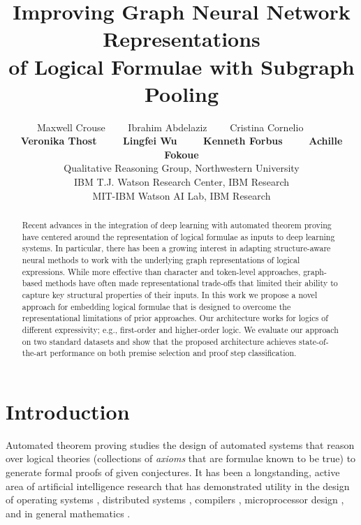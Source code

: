 \documentclass{article}
\title{Improving Graph Neural Network Representations \\ of Logical Formulae with Subgraph Pooling}
\author{Maxwell Crouse \ \ \ \ Ibrahim Abdelaziz \ \ \ \ Cristina Cornelio \ \ \ \ \\ {\bf Veronika Thost \ \ \ \ Lingfei Wu \ \ \ \ Kenneth Forbus \ \ \ \ Achille Fokoue} \\
  Qualitative Reasoning Group, Northwestern University \\
  IBM T.J. Watson Research Center, IBM Research \\
  MIT-IBM Watson AI Lab, IBM Research
}
\begin{document}
\maketitle

\begin{abstract}
Recent advances in the integration of deep learning with automated theorem proving have centered around the representation of logical formulae as inputs to deep learning systems. In particular, there has been a growing interest in adapting structure-aware neural methods to work with the underlying graph representations of logical expressions. While more effective than character and token-level approaches, graph-based methods have often made representational trade-offs that limited their ability to capture key structural properties of their inputs. In this work we propose a novel approach for embedding logical formulae that is designed to overcome the representational limitations of prior approaches. Our architecture works for logics of different expressivity; e.g., first-order and higher-order logic. 
We evaluate our approach on two standard datasets and show that the proposed architecture achieves state-of-the-art performance on both premise selection and proof step classification.


\end{abstract}



\section{Introduction}
\label{sec:intro}

Automated theorem proving studies the design of automated systems that reason over 
logical theories (collections of \emph{axioms} that are formulae known to be true) to generate formal proofs of given conjectures. It has been a longstanding, active area of artificial intelligence research that has demonstrated utility in the design of operating systems \cite{klein2009operating,klein2014comprehensive}, distributed systems \cite{garland1998ioa,hawblitzel2015ironfleet}, compilers \cite{curzon1991verified,leroy2009formal}, microprocessor design \cite{hunt1989microprocessor}, and in general mathematics \cite{hales2017formal}.
\end{document}
